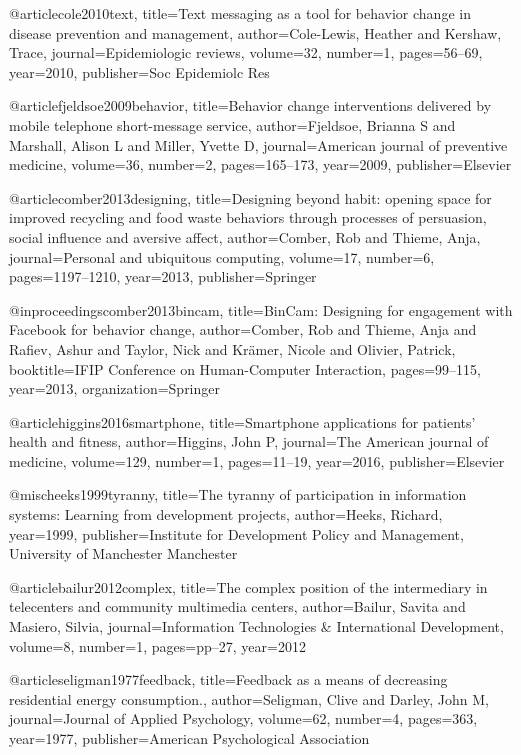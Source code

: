 @article{cole2010text,
  title={Text messaging as a tool for behavior change in disease prevention and management},
  author={Cole-Lewis, Heather and Kershaw, Trace},
  journal={Epidemiologic reviews},
  volume={32},
  number={1},
  pages={56--69},
  year={2010},
  publisher={Soc Epidemiolc Res}
}

@article{fjeldsoe2009behavior,
  title={Behavior change interventions delivered by mobile telephone short-message service},
  author={Fjeldsoe, Brianna S and Marshall, Alison L and Miller, Yvette D},
  journal={American journal of preventive medicine},
  volume={36},
  number={2},
  pages={165--173},
  year={2009},
  publisher={Elsevier}
}

@article{comber2013designing,
  title={Designing beyond habit: opening space for improved recycling and food waste behaviors through processes of persuasion, social influence and aversive affect},
  author={Comber, Rob and Thieme, Anja},
  journal={Personal and ubiquitous computing},
  volume={17},
  number={6},
  pages={1197--1210},
  year={2013},
  publisher={Springer}
}

@inproceedings{comber2013bincam,
  title={BinCam: Designing for engagement with Facebook for behavior change},
  author={Comber, Rob and Thieme, Anja and Rafiev, Ashur and Taylor, Nick and Kr{\"a}mer, Nicole and Olivier, Patrick},
  booktitle={IFIP Conference on Human-Computer Interaction},
  pages={99--115},
  year={2013},
  organization={Springer}
}


@article{higgins2016smartphone,
  title={Smartphone applications for patients' health and fitness},
  author={Higgins, John P},
  journal={The American journal of medicine},
  volume={129},
  number={1},
  pages={11--19},
  year={2016},
  publisher={Elsevier}
}

@misc{heeks1999tyranny,
  title={The tyranny of participation in information systems: Learning from development projects},
  author={Heeks, Richard},
  year={1999},
  publisher={Institute for Development Policy and Management, University of Manchester Manchester}
}

@article{bailur2012complex,
  title={The complex position of the intermediary in telecenters and community multimedia centers},
  author={Bailur, Savita and Masiero, Silvia},
  journal={Information Technologies \& International Development},
  volume={8},
  number={1},
  pages={pp--27},
  year={2012}
}


@article{seligman1977feedback,
  title={Feedback as a means of decreasing residential energy consumption.},
  author={Seligman, Clive and Darley, John M},
  journal={Journal of Applied Psychology},
  volume={62},
  number={4},
  pages={363},
  year={1977},
  publisher={American Psychological Association}
}

